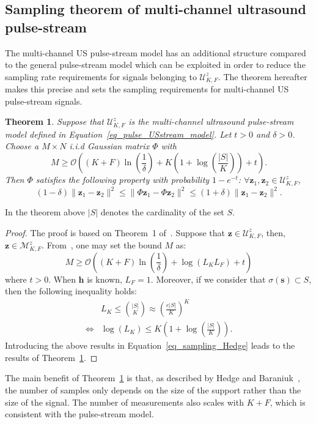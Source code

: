 \documentclass{article}
\newtheorem{theorem}{Theorem}
\newcommand{\vect}[1]{\bm{#1}}
\newcommand{\mat}[1]{\mathsf{#1}}
\theoremstyle{definition}
\begin{document}
\subsection{Sampling theorem of multi-channel ultrasound pulse-stream}
\label{subsec_sampling_pulse_stream}
The multi-channel US pulse-stream model has an additional structure compared to the general pulse-stream model which can be exploited in order to reduce the sampling rate requirements for signals belonging to $\mathcal{U}^z_{K,F}$. The theorem hereafter makes this precise and sets the sampling requirements for multi-channel US pulse-stream signals.
\begin{theorem}
	\label{th_stream_pulse_us}
	Suppose that $\mathcal{U}^z_{K,F}$ is the multi-channel ultrasound pulse-stream model defined in Equation~\eqref{eq_pulse_USstream_model}. Let $t > 0$ and $\delta > 0$. Choose a $M \times N$ i.i.d Gaussian matrix $\mat{\Phi}$ with 
	\begin{equation*}
	M \geq \mathcal{O} \left(\left(K + F\right) \ln \left(\frac{1}{\delta} \right) + K \left( 1 + \log \left(\frac{|S|}{K}\right)\right) + t\right).
	\end{equation*} 
	Then $\mat{\Phi}$ satisfies the following property with probability $1-e^{-t}$: $\forall \vect{z}_1, \vect{z}_2 \in \mathcal{U}^z_{K,F}$, 
	\begin{equation*}
	\left(1- \delta\right) \| \vect{z}_1 - \vect{z}_2\|^2 \leq \| \mat{\Phi} \vect{z}_1 - \mat{\Phi} \vect{z}_2\|^2\leq \left(1+ \delta\right) \| \vect{z}_1 - \vect{z}_2\|^2.
	\end{equation*}
\end{theorem}
In the theorem above $|S|$ denotes the cardinality of the set $S$.
\begin{proof}
	The proof is based on Theorem~\num{1} of~\cite{Hedge_TSP_2011}. Suppose that $\vect{z} \in \mathcal{U}^z_{K,F}$, then, $\vect{z} \in \mathcal{M}^z_{K,F}$. From~\cite{Hedge_TSP_2011}, one may set the bound $M$ as:
	\begin{equation}
		\label{eq_sampling_Hedge}
		M \geq \mathcal{O} \left(\left(K + F\right) \ln \left(\frac{1}{\delta}\right) + \log \left(L_K L_F\right) + t\right)
	\end{equation} 
	where $t > 0$. When $\vect{h}$ is known, $L_F = 1$. Moreover, if we consider that $\sigma \left(\vect{s}\right) \subset S$, then the following inequality holds:
	\begin{align*}
		&L_K \leq {{|S|}\choose{K}} \approx \left(\frac{e|S|}{K}\right)^K \\
		\Leftrightarrow & \log \left(L_K\right) \leq K \left(1 + \log\left(\frac{|S|}{K}\right)\right).
	\end{align*}
	Introducing the above results in Equation~\eqref{eq_sampling_Hedge} leads to the results of Theorem~\ref{th_stream_pulse_us}.
\end{proof}
The main benefit of Theorem~\ref{th_stream_pulse_us} is that, as described by Hedge and Baraniuk~\cite{Hedge_TSP_2011}, the number of samples only depends on the size of the support rather than the size of the signal. The number of measurements also scales with $K+F$, which is consistent with the pulse-stream model.
\end{document}
